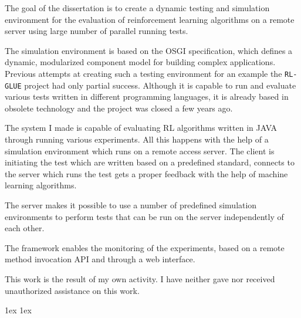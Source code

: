 \documentclass[final]{ubb_dolgozat}
\author{%
Gáll Norbert
}
\begin{document}
\begin{abstractEN} %



 \color{gray!60!red}
	The goal of the dissertation is to create a dynamic testing and simulation environment for the evaluation of reinforcement learning algorithms on a remote server using large number of parallel running tests.
	
	The simulation environment is based on the OSGI specification, which defines a dynamic, modularized component model for building complex applications. 
Previous attempts at creating such a testing environment for an example the \texttt{RL-GLUE} project had only partial success. Although it is capable to run and evaluate various tests written in different programming languages, it is already based in obsolete technology and the project was closed a few years ago. 

	The system I made is capable of evaluating RL algorithms written in JAVA through running various experiments. All this happens with the help of a simulation environment which runs on a remote access server. The client is initiating the test which are written based on a  predefined standard, connects to the server which runs the test gets a proper feedback with the help of machine learning algorithms. 

	The server makes it possible to use a number of predefined simulation environments to perform tests that  can be run on the server independently of each other.
	 
	The framework enables the monitoring of the experiments, based on a remote method invocation API and through a web interface. 

	This work is the result of my own activity. I have neither gave nor received unauthorized assistance on this work.


\end{abstractEN}

\maketitle

{ \baselineskip 1ex
  \parskip 1ex
  \tableofcontents
}
\end{document}
